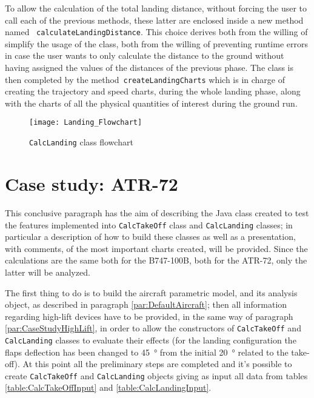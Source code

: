 \bigskip
\noindent
To allow the calculation of the total landing distance, without forcing the user to call each of the previous methods, these latter are enclosed inside a new method named ~\lstinline[language=Java]!calculateLandingDistance!. This choice derives both from the willing of simplify the usage of the class, both from the willing of preventing runtime errors in case the user wants to only calculate the distance to the ground without having assigned the values of the distances of the previous phase. The class is then completed by the method~\lstinline[language=Java]!createLandingCharts! which is in charge of creating the trajectory and speed charts, during the whole landing phase, along with the charts of all the physical quantities of interest during the ground run.
%
\begin{figure}[H]
\centering
\texttt{[image: Landing\_Flowchart]}
\caption{\lstinline[language=Java]!CalcLanding! class flowchart}
\label{fig:CalcLandingFlowchart}
\end{figure}
%
\section{Case study: ATR-72}
This conclusive paragraph has the aim of describing the Java class created to test the features implemented into \lstinline[language=Java]!CalcTakeOff! class and \lstinline[language=Java]!CalcLanding! classes; in particular a description of how to build these classes as well as a presentation, with comments, of the most important charts created, will be provided. 
%
Since the calculations are the same both for the B747-100B, both for the ATR-72, only the latter will be analyzed. 

\bigskip
\noindent
The first thing to do is to build the aircraft parametric model, and its analysis object, as described in paragraph \ref{par:DefaultAircraft}; then all information regarding high-lift devices have to be provided, in the same way of paragraph \ref{par:CaseStudyHighLift}, in order to allow the constructors of \lstinline[language=Java]!CalcTakeOff! and \lstinline[language=Java]!CalcLanding! classes to evaluate their effects (for the landing configuration the flaps deflection has been changed to \SI{45}{\degree} from the initial \SI{20}{\degree} related to the take-off). 
%
At this point all the preliminary steps are completed and it's possible to create \lstinline[language=Java]!CalcTakeOff! and \lstinline[language=Java]!CalcLanding! objects giving as input all data from tables \ref{table:CalcTakeOffInput} and \ref{table:CalcLandingInput}.

